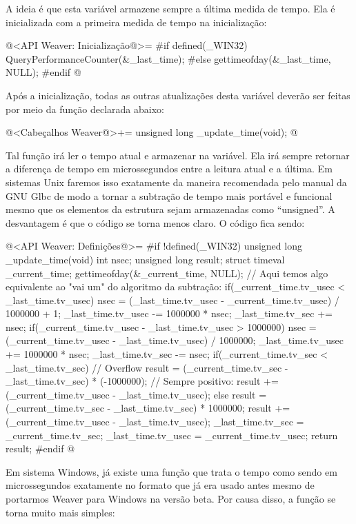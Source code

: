 A ideia é que esta variável armazene sempre a última medida de
tempo. Ela é inicializada com a primeira medida de tempo na
inicialização:

\iniciocodigo
@<API Weaver: Inicialização@>=
#if defined(_WIN32)
QueryPerformanceCounter(&_last_time);
#else
gettimeofday(&_last_time, NULL);
#endif
@
\fimcodigo

Após a inicialização, todas as outras atualizações desta variável
deverão ser feitas por meio da função declarada abaixo:

\iniciocodigo
@<Cabeçalhos Weaver@>+=
unsigned long _update_time(void);
@
\fimcodigo

Tal função irá ler o tempo atual e armazenar na variável. Ela irá
sempre retornar a diferença de tempo em microssegundos entre a leitura
atual e a última. Em sistemas Unix faremos isso exatamente da maneira
recomendada pelo manual da GNU Glbc de modo a tornar a subtração de
tempo mais portável e funcional mesmo que os elementos da
estrutura  sejam armazenadas como ``unsigned''.  A
desvantagem é que o código se torna menos claro. O código fica sendo:

\iniciocodigo
@<API Weaver: Definições@>=
#if !defined(_WIN32)
unsigned long _update_time(void){
  int nsec;
  unsigned long result;
  struct timeval _current_time;
  gettimeofday(&_current_time, NULL);
  // Aqui temos algo equivalente ao "vai um" do algoritmo da subtração:
  if(_current_time.tv_usec < _last_time.tv_usec){
    nsec = (_last_time.tv_usec - _current_time.tv_usec) / 1000000 + 1;
    _last_time.tv_usec -= 1000000 * nsec;
    _last_time.tv_sec += nsec;
  }
  if(_current_time.tv_usec - _last_time.tv_usec > 1000000){
    nsec = (_current_time.tv_usec - _last_time.tv_usec) / 1000000;
    _last_time.tv_usec += 1000000 * nsec;
    _last_time.tv_sec -= nsec;
  }
  if(_current_time.tv_sec < _last_time.tv_sec){
    // Overflow
    result = (_current_time.tv_sec - _last_time.tv_sec) * (-1000000);
    // Sempre positivo:
    result += (_current_time.tv_usec - _last_time.tv_usec);
  }
  else{
    result = (_current_time.tv_sec - _last_time.tv_sec) * 1000000;
    result += (_current_time.tv_usec - _last_time.tv_usec);
  }
  _last_time.tv_sec = _current_time.tv_sec;
  _last_time.tv_usec = _current_time.tv_usec;
  return result;
}
#endif
@
\fimcodigo

Em sistema Windows, já existe uma função que trata o tempo como sendo
em microssegundos exatamente no formato que já era usado antes mesmo
de portarmos Weaver para Windows na versão beta. Por causa disso, a
função se torna muito mais simples:

